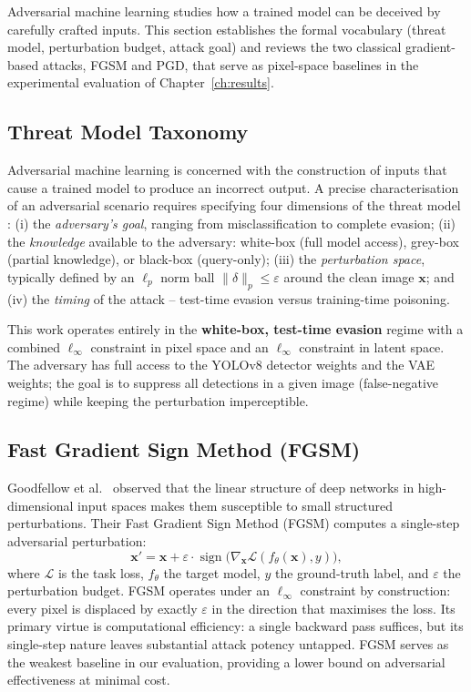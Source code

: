 \documentclass[12pt,a4paper]{report}
\begin{document}
Adversarial machine learning studies how a trained model can be deceived
by carefully crafted inputs. This section establishes the formal
vocabulary (threat model, perturbation budget, attack goal) and
reviews the two classical gradient-based attacks, FGSM and PGD, that
serve as pixel-space baselines in the experimental evaluation of
Chapter~\ref{ch:results}.

\subsection{Threat Model Taxonomy}

Adversarial machine learning is concerned with the construction of inputs that
cause a trained model to produce an incorrect output. A precise characterisation
of an adversarial scenario requires specifying four dimensions of the threat
model \cite{biggio2013}: (i) the \emph{adversary's goal}, ranging from
misclassification to complete evasion; (ii) the \emph{knowledge} available to
the adversary: white-box (full model access), grey-box (partial knowledge),
or black-box (query-only); (iii) the \emph{perturbation space}, typically
defined by an $\ell_p$ norm ball $\|\delta\|_p \leq \varepsilon$ around the
clean image $\mathbf{x}$; and (iv) the \emph{timing} of the attack --
test-time evasion versus training-time poisoning.

This work operates entirely in the \textbf{white-box, test-time evasion}
regime with a combined $\ell_\infty$ constraint in pixel space and an
$\ell_\infty$ constraint in latent space. The adversary has full access to
the YOLOv8 detector weights and the VAE weights; the goal is to suppress all
detections in a given image (false-negative regime) while keeping the
perturbation imperceptible.

\subsection{Fast Gradient Sign Method (FGSM)}

Goodfellow et al.\ \cite{goodfellow2014explaining} observed that the linear structure
of deep networks in high-dimensional input spaces makes them susceptible to
small structured perturbations. Their Fast Gradient Sign Method (FGSM)
computes a single-step adversarial perturbation:
%
\begin{equation}
  \mathbf{x}' = \mathbf{x} + \varepsilon \cdot \operatorname{sign}
    \bigl(\nabla_{\mathbf{x}} \mathcal{L}(f_\theta(\mathbf{x}), y)\bigr),
  \label{eq:fgsm}
\end{equation}
%
where $\mathcal{L}$ is the task loss, $f_\theta$ the target model, $y$ the
ground-truth label, and $\varepsilon$ the perturbation budget. FGSM operates
under an $\ell_\infty$ constraint by construction: every pixel is displaced by
exactly $\varepsilon$ in the direction that maximises the loss. Its primary
virtue is computational efficiency: a single backward pass suffices, but
its single-step nature leaves substantial attack potency untapped. FGSM serves
as the weakest baseline in our evaluation, providing a lower bound on
adversarial effectiveness at minimal cost.
\end{document}
